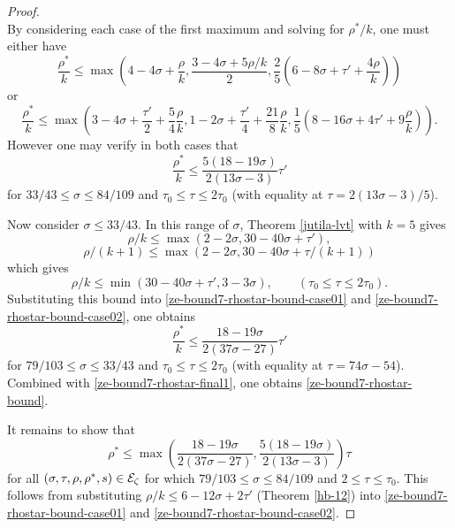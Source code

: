 \begin{proof}
\[\]
By considering each case of the first maximum and solving for $\rho^*/k$, one must either have
\begin{equation}\label{ze-bound7-rhostar-bound-case01}
\frac{\rho^*}{k} \le \max(4 - 4\sigma + \frac{\rho}{k}, \frac{3 - 4\sigma + 5\rho/k}{2}, \frac{2}{5}(6 - 8\sigma + \tau' + \frac{4\rho}{k}))
\end{equation}
or
\begin{equation}\label{ze-bound7-rhostar-bound-case02}
\frac{\rho^*}{k} \le \max(3 - 4\sigma + \frac{\tau'}{2} + \frac{5}{4}\frac{\rho}{k}, 1 - 2\sigma + \frac{\tau'}{4} + \frac{21}{8}\frac{\rho}{k}, \frac{1}{5}(8 - 16\sigma + 4\tau' + 9\frac{\rho}{k})).
\end{equation}
However one may verify in both cases that
\begin{equation}\label{ze-bound7-rhostar-final1}
\frac{\rho^*}{k} \le \frac{5(18 - 19\sigma)}{2(13\sigma - 3)}\tau'
\end{equation}
for $33/43\le \sigma \le 84/109$ and $\tau_0 \le \tau \le 2\tau_0$ (with equality at $\tau = 2(13\sigma - 3)/5$).

Now consider $\sigma \le 33/43$. In this range of $\sigma$, Theorem \ref{jutila-lvt} with $k = 5$ gives
\[
\rho/k \le \max(2 - 2\sigma, 30 - 40\sigma + \tau'),
\]
\[
\rho/(k + 1) \le \max(2 - 2\sigma, 30 - 40\sigma + \tau/(k + 1))
\]
which gives
\[
\rho/k \le \min(30 - 40\sigma + \tau', 3 - 3\sigma),\qquad (\tau_0 \le \tau \le 2\tau_0).
\]
Substituting this bound into \eqref{ze-bound7-rhostar-bound-case01} and \eqref{ze-bound7-rhostar-bound-case02}, one obtains
\[
\frac{\rho^*}{k} \le \frac{18 - 19\sigma}{2(37\sigma - 27)}\tau'
\]
for $79/103 \le \sigma \le 33/43$ and $\tau_0 \le \tau \le 2\tau_0$ (with equality at $\tau = 74\sigma - 54$). Combined with \eqref{ze-bound7-rhostar-final1}, one obtains \eqref{ze-bound7-rhostar-bound}.

It remains to show that
\begin{equation}\label{ze-bound7-rhostar-zeta-bound}
\rho^* \le \max\left(\frac{18 - 19\sigma}{2(37\sigma - 27)}, \frac{5(18 - 19\sigma)}{2(13\sigma - 3)}\right)\tau
\end{equation}
for all $(\sigma, \tau, \rho, \rho^*, s) \in \mathcal{E}_\zeta$ for which $79/103 \le \sigma \le 84/109$ and $2 \le \tau \le \tau_0$. This follows from substituting $\rho/k \le 6 - 12\sigma + 2\tau'$ (Theorem \ref{hb-12}) into \eqref{ze-bound7-rhostar-bound-case01} and \eqref{ze-bound7-rhostar-bound-case02}.
\end{proof}

